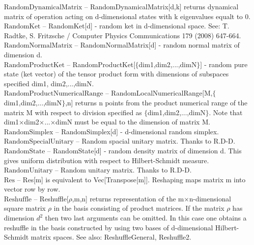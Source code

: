 \documentclass[a4paper,10pt]{scrartcl}
\begin{document}
\textbf{$ \text{RandomDynamicalMatrix} $ }-- RandomDynamicalMatrix[d,k] returns dynamical matrix of operation acting on d-dimensional states with k eigenvalues equalt to 0.$  $\\

\textbf{$ \text{RandomKet} $ }-- RandomKet[d] - random ket in d-dimensional space. See: T. Radtke, S. Fritzsche / Computer Physics Communications 179 (2008) 647-664.$  $\\

\textbf{$ \text{RandomNormalMatrix} $ }-- RandomNormalMatrix[d] - random normal matrix of dimension d.$  $\\

\textbf{$ \text{RandomProductKet} $ }-- RandomProductKet[$\{$dim1,dim2,...,dimN$\}$] - random pure state (ket vector) of the tensor product form with dimensions of subspaces specified dim1, dim2,...,dimN.$  $\\

\textbf{$ \text{RandomProductNumericalRange} $ }-- RandomLocalNumericalRange[M,$\{$dim1,dim2,...,dimN$\}$,n] returns n points from the product numerical range of the matrix M with respect to division specified as $\{$dim1,dim2,...,dimN$\}$. Note that dim1$\times $dim2$\times $...$\times $dimN must be equal to the dimension of matrix M.$  $\\

\textbf{$ \text{RandomSimplex} $ }-- RandomSimplex[d] - d-dimensional random simplex.$  $\\

\textbf{$ \text{RandomSpecialUnitary} $ }-- Random spacial unitary matrix. Thanks to R.D-D.$  $\\

\textbf{$ \text{RandomState} $ }-- RandomState[d] - random density matrix of dimension d. This gives uniform distribution with respect to Hilbert-Schmidt measure.$  $\\

\textbf{$ \text{RandomUnitary} $ }-- Random unitary matrix. Thanks to R.D-D.$  $\\

\textbf{$ \text{Res} $ }-- Res[m] is equivalent to Vec[Transpose[m]]. Reshaping maps matrix m into vector row by row.$  $\\

\textbf{$ \text{Reshuffle} $ }-- Reshuffle[$\rho $,m,n] returns representation of the m$\times $n-dimensional square matrix $\rho $ in the basis consisting of product matrices. If  the matrix $\rho $ has dimension $ d^2 $ then two last arguments can be omitted. In this case one obtains a reshuffle in the basis constructed by using two bases of d-dimensional Hilbert-Schmidt matrix spaces. See also: ReshuffleGeneral, Reshuffle2.$  $\\
\end{document}
